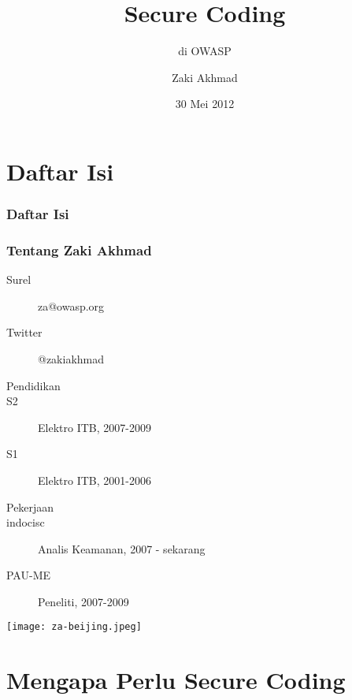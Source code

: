 \documentclass[xcolor=pdftex,table,handouts]{beamer}
\begin{document}
\title{Secure Coding}
\subtitle{di OWASP}
\author{Zaki Akhmad}
\date{30 Mei 2012}

\begin{frame}
	\titlepage
\end{frame}

\section*{Daftar Isi}

\begin{frame}
	\frametitle{Daftar Isi}
		\tableofcontents
\end{frame}


\begin{frame}
	\frametitle{Tentang Zaki Akhmad}
			\begin{description}
				\item[Surel] za@owasp.org
				\item[Twitter] @zakiakhmad	
				\item[Pendidikan]
				\item[S2] Elektro ITB, 2007-2009
				\item[S1] Elektro ITB, 2001-2006
				\item[Pekerjaan]
				\item[indocisc] Analis Keamanan, 2007 - sekarang
				\item[PAU-ME] Peneliti, 2007-2009
			\end{description}
 			\begin{flushleft}
				\texttt{[image: za-beijing.jpeg]}
			\end{flushleft}
\end{frame}

\section{Mengapa Perlu Secure Coding}

\end{document}

